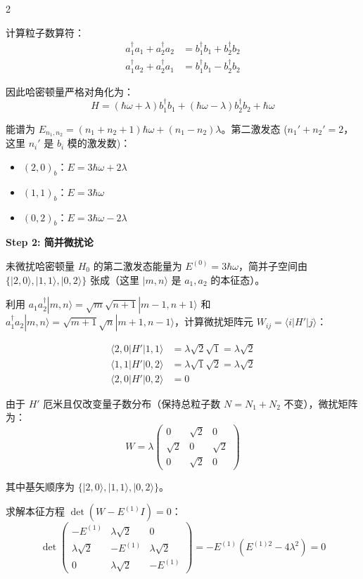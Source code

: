 \begin{multicols}{2}
\begin{derivationbox}[标准解题过程]
计算粒子数算符：
\begin{align*}
a_1^\dagger a_1 + a_2^\dagger a_2 &= b_1^\dagger b_1 + b_2^\dagger b_2 \\
a_1^\dagger a_2 + a_2^\dagger a_1 &= b_1^\dagger b_1 - b_2^\dagger b_2
\end{align*}

因此哈密顿量严格对角化为：
\[
H = (\hbar\omega + \lambda) b_1^\dagger b_1 + (\hbar\omega - \lambda) b_2^\dagger b_2 + \hbar\omega
\]

能谱为 $E_{n_1, n_2} = (n_1 + n_2 + 1)\hbar\omega + (n_1 - n_2)\lambda$。第二激发态 ($n_1' + n_2' = 2$，这里 $n_i'$ 是 $b_i$ 模的激发数)：
\begin{itemize}[nosep]
    \item $(2, 0)_b$：$E = 3\hbar\omega + 2\lambda$
    \item $(1, 1)_b$：$E = 3\hbar\omega$
    \item $(0, 2)_b$：$E = 3\hbar\omega - 2\lambda$
\end{itemize}

\textbf{Step 2: 简并微扰论}

未微扰哈密顿量 $H_0$ 的第二激发态能量为 $E^{(0)} = 3\hbar\omega$，简并子空间由 $\{|2,0\rangle, |1,1\rangle, |0,2\rangle\}$ 张成（这里 $|m,n\rangle$ 是 $a_1, a_2$ 的本征态）。

利用 $a_1 a_2^\dagger |m,n\rangle = \sqrt{m}\sqrt{n+1} |m-1, n+1\rangle$ 和 $a_1^\dagger a_2 |m,n\rangle = \sqrt{m+1}\sqrt{n} |m+1, n-1\rangle$，计算微扰矩阵元 $W_{ij} = \langle i | H' | j \rangle$：

\begin{align*}
\langle 2,0 | H' | 1,1 \rangle &= \lambda \sqrt{2}\sqrt{1} = \lambda\sqrt{2} \\
\langle 1,1 | H' | 0,2 \rangle &= \lambda \sqrt{1}\sqrt{2} = \lambda\sqrt{2} \\
\langle 2,0 | H' | 0,2 \rangle &= 0
\end{align*}

由于 $H'$ 厄米且仅改变量子数分布（保持总粒子数 $N = N_1 + N_2$ 不变），微扰矩阵为：
\[
W = \lambda \begin{pmatrix}
0 & \sqrt{2} & 0 \\
\sqrt{2} & 0 & \sqrt{2} \\
0 & \sqrt{2} & 0
\end{pmatrix}
\]

其中基矢顺序为 $\{|2,0\rangle, |1,1\rangle, |0,2\rangle\}$。

求解本征方程 $\det(W - E^{(1)} I) = 0$：
\[
\det \begin{pmatrix}
-E^{(1)} & \lambda\sqrt{2} & 0 \\
\lambda\sqrt{2} & -E^{(1)} & \lambda\sqrt{2} \\
0 & \lambda\sqrt{2} & -E^{(1)}
\end{pmatrix} = -E^{(1)}(E^{(1)2} - 4\lambda^2) = 0
\]


\end{derivationbox}
\end{multicols}
